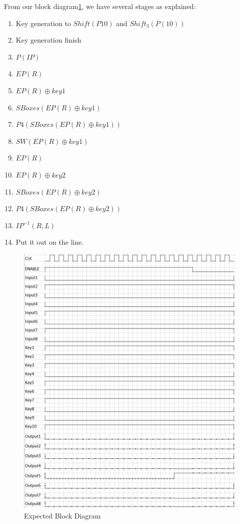 \documentclass{article}
\begin{document}
From our block diagram\ref{fig:BlockDiagram}, we have several stages as explained:

\begin{enumerate}
  \item Key generation to $Shift(P10)$ and $Shift_{3}(P(10))$
  \item Key generation finish
  \item $P(IP)$
  \item $EP(R)$
  \item $EP(R) \oplus key1$
  \item $SBoxes(EP(R) \oplus key1)$
  \item $P4(SBoxes(EP(R) \oplus key1))$
  \item $SW(EP(R) \oplus key1)$
  \item $EP(R)$
  \item $EP(R) \oplus key2$
  \item $SBoxes(EP(R) \oplus key2)$
  \item $P4(SBoxes(EP(R) \oplus key2))$
  \item $IP^{-1}(R,L)$
  \item Put it out on the line.
\end{enumerate}


\begin{figure}
  \includegraphics[width=\linewidth]{../img/TimingDiagram_Milestone1.png}
  \caption{Expected Block Diagram}
  \label{fig:BlockDiagram}
\end{figure}
\end{document}
